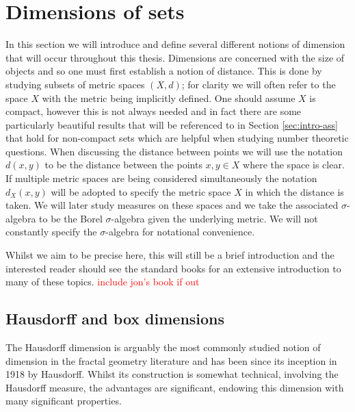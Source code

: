 \section{Dimensions of sets}
\label{sec:intro-sets}

In this section we will introduce and define several different notions of dimension that will occur throughout this thesis. Dimensions are concerned with the size of objects and so one must first establish a notion of distance. This is done by studying subsets of metric spaces $(X,d)$; for clarity we will often refer to the space $X$ with the metric being implicitly defined. One should assume $X$ is compact, however this is not always needed and in fact there are some particularly beautiful results that will be referenced to in Section \ref{sec:intro-ass} that hold for non-compact sets which are helpful when studying number theoretic questions. When discussing the distance between points we will use the notation $d(x,y)$ to be the distance between the points $x,y \in X$ where the space is clear. If multiple metric spaces are being considered simultaneously the notation $d_X(x,y)$ will be adopted to specify the metric space $X$ in which the distance is taken. We will later study measures on these spaces and we take the associated $\sigma$-algebra to be the Borel $\sigma$-algebra given the underlying metric. We will not constantly specify the $\sigma$-algebra for notational convenience.

Whilst we aim to be precise here, this will still be a brief introduction and the interested reader should see the standard books \cite{falconer, falconer2, mattila} for an extensive introduction to many of these topics. \textcolor{red}{include jon's book if out} 



\subsection{Hausdorff and box dimensions}
\label{sec:intro-haus-box}

The Hausdorff dimension is arguably the most commonly studied notion of dimension in the fractal geometry literature and has been since its inception in 1918 by Hausdorff. Whilst its construction is somewhat technical, involving the Hausdorff measure, the advantages are significant, endowing this dimension with many significant properties. 

